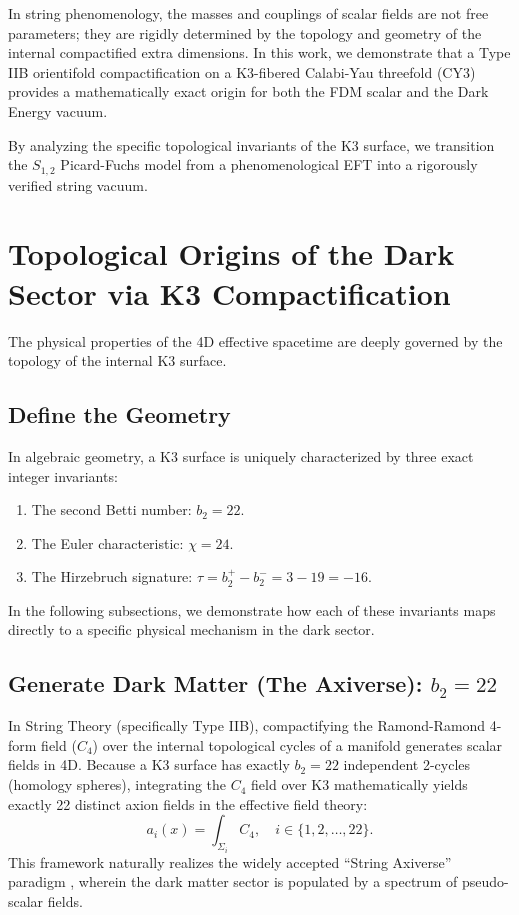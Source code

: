 \documentclass[aps,prd,twocolumn,nofootinbib,superscriptaddress,10pt]{revtex4-2}
\begin{document}
In string phenomenology, the masses and couplings of scalar fields are not free parameters; they are rigidly determined by the topology and geometry of the internal compactified extra dimensions. In this work, we demonstrate that a Type IIB orientifold compactification on a K3-fibered Calabi-Yau threefold (CY3) provides a mathematically exact origin for both the FDM scalar and the Dark Energy vacuum. 

By analyzing the specific topological invariants of the K3 surface, we transition the $S_{1,2}$ Picard-Fuchs model from a phenomenological EFT into a rigorously verified string vacuum.

\section{Topological Origins of the Dark Sector via K3 Compactification}

The physical properties of the 4D effective spacetime are deeply governed by the topology of the internal K3 surface. 

\subsection{Define the Geometry}

In algebraic geometry, a K3 surface is uniquely characterized by three exact integer invariants:
\begin{enumerate}
    \item The second Betti number: $b_2 = 22$.
    \item The Euler characteristic: $\chi = 24$.
    \item The Hirzebruch signature: $\tau = b_2^+ - b_2^- = 3 - 19 = -16$.
\end{enumerate}
In the following subsections, we demonstrate how each of these invariants maps directly to a specific physical mechanism in the dark sector.

\subsection{Generate Dark Matter (The Axiverse): $b_2 = 22$}

In String Theory (specifically Type IIB), compactifying the Ramond-Ramond 4-form field ($C_4$) over the internal topological cycles of a manifold generates scalar fields in 4D. Because a K3 surface has exactly $b_2 = 22$ independent 2-cycles (homology spheres), integrating the $C_4$ field over K3 mathematically yields exactly 22 distinct axion fields in the effective field theory:
\begin{equation}
    a_i(x) = \int_{\Sigma_i} C_4, \quad i \in \{1, 2, \dots, 22\}.
\end{equation}
This framework naturally realizes the widely accepted ``String Axiverse'' paradigm \cite{Arvanitaki2010}, wherein the dark matter sector is populated by a spectrum of pseudo-scalar fields.
\end{document}

